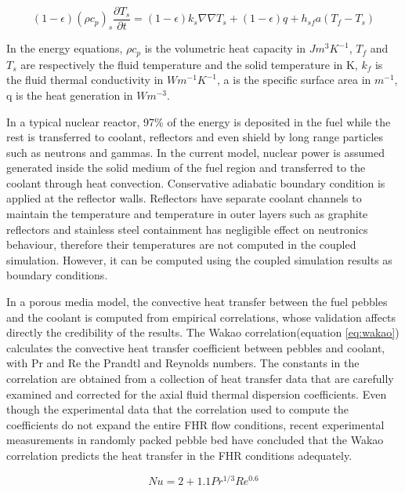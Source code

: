 \documentclass{elsarticle}
\begin{document}
\begin{equation}
  (1-\epsilon)(\rho c_p)_s \frac{\partial T_s}{\partial t} =(1-\epsilon)k_s \nabla\nabla T_s + (1-\epsilon)q + h_{sf}a(T_f - T_s)
  \label{eq:pm_sol}
\end{equation}

In the energy equations, $\rho c_p$ is the volumetric heat capacity in $Jm^3K^{-1}$, $T_f$ and $T_s$ are respectively the fluid temperature and the solid temperature in K, $k_f$ is the fluid thermal conductivity in $Wm^{-1}K^{-1}$, a is the specific surface area in $m^{-1}$, q is the heat generation in $Wm^{-3}$.

In a typical nuclear reactor, 97\% of the energy is deposited in the fuel while the rest is transferred to coolant, reflectors and even shield by long range particles such as neutrons and gammas. 
In the current model, nuclear power is assumed generated inside the solid medium of the fuel region and transferred to the coolant through heat convection. Conservative adiabatic boundary condition is applied at the reflector walls. Reflectors have separate coolant channels to maintain the temperature and temperature in outer layers such as graphite reflectors and stainless steel containment has negligible effect on neutronics behaviour, therefore their temperatures are not computed in the coupled simulation. However, it can be computed using the coupled simulation results as boundary conditions.

In a porous media model, the convective heat transfer between the fuel pebbles and the coolant is computed from empirical correlations, whose validation affects directly the credibility of the results. The Wakao correlation(equation \ref{eq:wakao})\cite{Wakao1979} calculates the convective heat transfer coefficient between pebbles and coolant, with Pr and Re the Prandtl and Reynolds numbers.
The constants in the correlation are obtained from a collection of heat transfer data that are carefully examined and corrected for the axial fluid thermal dispersion coefficients. Even though the experimental data that the correlation used to compute the coefficients do not expand the entire FHR flow conditions, recent experimental measurements in randomly packed pebble bed\cite{Huddar2016} have concluded that the Wakao correlation predicts the heat transfer in the FHR conditions adequately.

\begin{equation}
  Nu = 2 + 1.1 Pr^{1/3}Re^{0.6} 
  \label{eq:wakao}
\end{equation}
\end{document}

